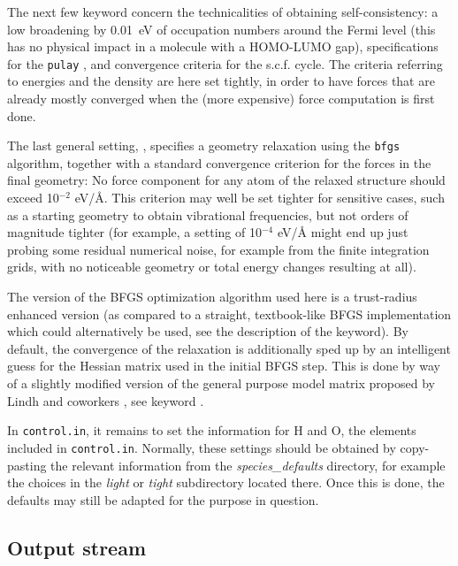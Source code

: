 The next few keyword concern the technicalities of obtaining
self-consistency: a low  broadening by
0.01~eV of occupation numbers around the Fermi level (this has no
physical impact in a molecule with a HOMO-LUMO gap), specifications
for the \texttt{pulay} , and convergence criteria for
the s.c.f. cycle. The criteria referring to energies and the density
are here set tightly, in order to have forces that are already mostly
converged when the (more expensive) force computation is first done. 

The last general setting, , specifies a
geometry relaxation using the \texttt{bfgs} algorithm, together with a
standard convergence criterion for the forces in the final geometry:
No force component for any atom of the relaxed structure should exceed
10$^{-2}$ eV/{\AA}. This criterion may well be set tighter
for sensitive cases, such as a starting geometry to obtain
vibrational frequencies, but not orders of magnitude tighter (for example, a
setting of 10$^{-4}$ eV/{\AA} might end up just probing some residual
numerical noise, for example from the finite integration grids, with no
noticeable geometry or total energy changes resulting at all).

The version of the BFGS optimization algorithm used here is a trust-radius
enhanced version (as compared to a straight, textbook-like BFGS implementation
which could alternatively be used, see the description of the
 keyword). By default, the convergence of the
relaxation is additionally sped up by an intelligent guess for the Hessian
matrix used in the initial BFGS step. This is done by way of a slightly
modified version of the general purpose model matrix proposed by Lindh and
coworkers \cite{Lin95}, see keyword .

In \texttt{control.in}, it remains to set the 
information for H and O, the elements included in
\texttt{control.in}. Normally, these settings should be obtained by
copy-pasting the relevant information from the
\emph{species\_defaults} directory, for example the 
choices in the \emph{light} or \emph{tight} subdirectory located there. Once 
this is done, the  defaults may still be adapted
for the purpose in question. 

\subsection*{Output stream}

